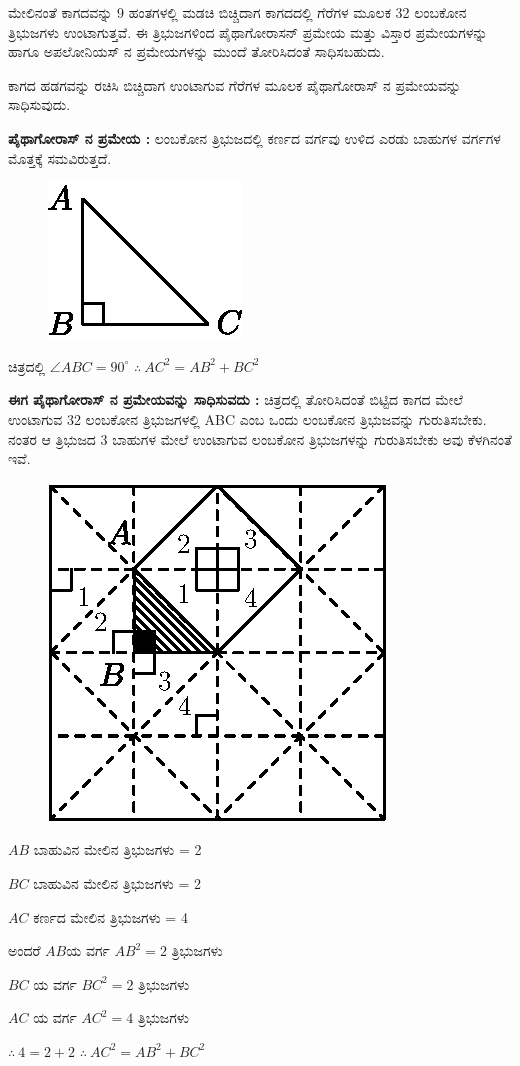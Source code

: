 \begin{itemize}
ಮೇಲಿನಂತೆ ಕಾಗದವನ್ನು 9 ಹಂತಗಳಲ್ಲಿ ಮಡಚಿ ಬಿಚ್ಚಿದಾಗ ಕಾಗದದಲ್ಲಿ ಗೆರೆಗಳ ಮೂಲಕ 32 ಲಂಬಕೋನ ತ್ರಿಭುಜಗಳು ಉಂಟಾಗುತ್ತವೆ. ಈ ತ್ರಿಭುಜಗಳಿಂದ ಪೈಥಾಗೋರಾಸನ್ ಪ್ರಮೇಯ ಮತ್ತು ವಿಸ್ತಾರ ಪ್ರಮೇಯಗಳನ್ನು ಹಾಗೂ ಅಪಲೋನಿಯಸ್ ನ ಪ್ರಮೇಯಗಳನ್ನು ಮುಂದೆ ತೋರಿಸಿದಂತೆ ಸಾಧಿಸಬಹುದು. 

ಕಾಗದ ಹಡಗವನ್ನು ರಚಿಸಿ ಬಿಚ್ಚಿದಾಗ ಉಂಟಾಗುವ ಗೆರೆಗಳ ಮೂಲಕ ಪೈಥಾಗೋರಾಸ್ ನ ಪ್ರಮೇಯವನ್ನು ಸಾಧಿಸುವುದು. 

\noindent
\medskip
\textbf{ಪೈಥಾಗೋರಾಸ್ ನ ಪ್ರಮೇಯ :} ಲಂಬಕೋನ ತ್ರಿಭುಜದಲ್ಲಿ ಕರ್ಣದ ವರ್ಗವು ಉಳಿದ ಎರಡು ಬಾಹುಗಳ ವರ್ಗಗಳ ಮೊತ್ತಕ್ಕೆ ಸಮವಿರುತ್ತದೆ. 
\begin{figure}[H]
\centering
\includegraphics[scale=.98]{src/figure/chap1/fig1-17d.eps}
\end{figure}

ಚಿತ್ರದಲ್ಲಿ $\angle ABC = 90^\circ$ $\therefore ~ AC^2 =  AB^2 +  BC^2 $

\medskip
\noindent
\textbf{ಈಗ ಪೈಥಾಗೋರಾಸ್ ನ ಪ್ರಮೇಯವನ್ನು ಸಾಧಿಸುವದು :} ಚಿತ್ರದಲ್ಲಿ ತೋರಿಸಿದಂತೆ ಬಿಟ್ಟಿದ ಕಾಗದ ಮೇಲೆ ಉಂಟಾಗುವ 32 ಲಂಬಕೋನ ತ್ರಿಭುಜಗಳಲ್ಲಿ ABC ಎಂಬ ಒಂದು ಲಂಬಕೋನ ತ್ರಿಭುಜವನ್ನು ಗುರುತಿಸಬೇಕು. ನಂತರ ಆ ತ್ರಿಭುಜದ 3 ಬಾಹುಗಳ ಮೇಲೆ ಉಂಟಾಗುವ ಲಂಬಕೋನ ತ್ರಿಭುಜಗಳನ್ನು ಗುರುತಿಸಬೇಕು ಅವು ಕೆಳಗಿನಂತೆ ಇವೆ. 
\begin{figure}[H]
\centering
\includegraphics[scale=.98]{src/figure/chap1/fig1-17e.eps}
\end{figure} 

$AB$ ಬಾಹುವಿನ ಮೇಲಿನ ತ್ರಿಭುಜಗಳು = 2 

$BC$ ಬಾಹುವಿನ ಮೇಲಿನ ತ್ರಿಭುಜಗಳು  = 2

$AC$ ಕರ್ಣದ ಮೇಲಿನ ತ್ರಿಭುಜಗಳು = 4

ಅಂದರೆ  $AB$ಯ ವರ್ಗ $AB^2 =2 $ ತ್ರಿಭುಜಗಳು 

$BC$ ಯ ವರ್ಗ $BC^2 = 2 $  ತ್ರಿಭುಜಗಳು

$AC$ ಯ ವರ್ಗ $AC^2 = 4$  ತ್ರಿಭುಜಗಳು

$\therefore ~ 4 = 2+2$ \quad $\therefore ~ AC^2 = AB^2 + BC^2$
\end{itemize}

